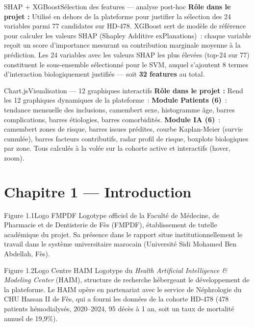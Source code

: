 \documentclass[12pt,a4paper]{article}
\begin{document}
\begin{toolbox}{SHAP + XGBoost}{Sélection des features --- analyse post-hoc}
\textbf{Rôle dans le projet :} Utilisé en dehors de la plateforme pour justifier
la sélection des 24 variables parmi 77 candidates sur HD-478. XGBoost sert de
modèle de référence pour calculer les valeurs SHAP (Shapley Additive
exPlanations)~: chaque variable reçoit un score d'importance mesurant sa
contribution marginale moyenne à la prédiction. Les 24 variables avec les
valeurs SHAP les plus élevées (top-24 sur 77) constituent le sous-ensemble
sélectionné pour le SVM, auquel s'ajoutent 8 termes d'interaction biologiquement
justifiés --- soit \textbf{32 features} au total.
\end{toolbox}

\begin{toolbox}{Chart.js}{Visualisation --- 12 graphiques interactifs}
\textbf{Rôle dans le projet :} Rend les 12 graphiques dynamiques de la plateforme~:
\textbf{Module Patients (6)}~: tendance mensuelle des inclusions, camembert sexe,
histogramme âge, barres complications, barres étiologies, barres comorbidités.
\textbf{Module IA (6)}~: camembert zones de risque, barres issues prédites,
courbe Kaplan-Meier (survie cumulée), barres facteurs contributifs, radar profil
de risque, boxplots biologiques par zone. Tous calculés à la volée sur la cohorte
active et interactifs (hover, zoom).
\end{toolbox}

\newpage
\section{Chapitre 1 --- Introduction}

\begin{figbox}{Figure 1.1}{Logo FMPDF}
Logotype officiel de la Faculté de Médecine, de Pharmacie et de Dentisterie de
Fès (FMPDF), établissement de tutelle académique du projet. Sa présence dans le
rapport situe institutionnellement le travail dans le système universitaire
marocain (Université Sidi Mohamed Ben Abdellah, Fès).
\end{figbox}

\begin{figbox}{Figure 1.2}{Logo Centre HAIM}
Logotype du \textit{Health Artificial Intelligence \& Modeling Center} (HAIM),
structure de recherche hébergeant le développement de la plateforme. Le HAIM
opère en partenariat avec le service de Néphrologie du CHU Hassan II de Fès,
qui a fourni les données de la cohorte HD-478 (478 patients hémodialysés,
2020--2024, 95 décès à 1 an, soit un taux de mortalité annuel de 19{,}9\%).
\end{figbox}
\end{document}
